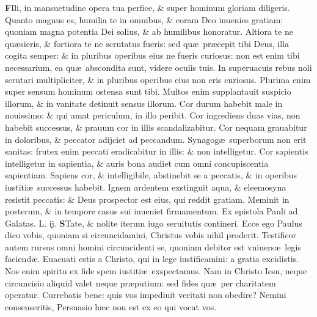 \documentclass[a5paper,10pt]{book}
\def\leftmarginnote{%
	\lrmarginnote{\hskip -\marginparsep \hskip -6.5em}}
\def\rightmarginnote{%
	\lrmarginnote{\hskip\columnwidth \hskip -1em}}
\def\ae{æ}
\begin{document}
\begin{multicols*}{2}
\vspace{-.25em}
\lettrine[lines=2]{\bfseries F}{}Ili, in\rightmarginnote{ca. 3.} mansuetudine opera tua perfice, \& super hominum gloriam diligeris.
Quanto magnus es, humilia te in
omnibus, \& coram Deo inuenies gratiam: quoniam magna potentia Dei solius, \& ab humilibus honoratur.
Altiora te ne qu\ae sieris, \& fortiora te ne scrutatus fueris: sed qu\ae \ pr\ae cepit tibi Deus, illa cogita semper: \& in pluribus operibus eius ne fueris curiosus: non est enim tibi necessarium, ea qu\ae \ abscondita sunt, videre oculis tuis.
In superuacuis rebus noli scrutari multipliciter, \& in pluribus operibus eius non eris curiosus. Plurima enim super sensum hominum ostensa sunt tibi.
Multos enim supplantauit suspicio illorum, \& in vanitate detinuit sensus illorum. Cor durum habebit male in nouissimo: \& qui amat periculum, in illo peribit.
Cor ingrediens duas vias, non habebit successus, \& prauum cor in illis scandalizabitur. Cor nequam grauabitur in doloribus, \& peccator adijciet ad peccandum.
Synagog\ae \ superborum non erit sanitas: frutex enim peccati eradicabitur in illis: \& non intelligetur.
Cor sapientis intelligetur in sapientia, \& auris bona audiet cum omni concupiscentia sapientiam.
Sapiens cor, \& intelligibile, abstinebit se a peccatis, \& in operibus iustiti\ae \ successus habebit.
Ignem ardentem exstinguit aqua, \& eleemosyna resistit peccatis: \& Deus prospector est eius, qui reddit gratiam. Meminit in posterum, \& in tempore casus sui inueniet firmamentum.
\fancyhead[C]{\color{red} Feria. vj. Dominic\ae . j. Vagantium}
\newline {} \color{red} Ex epistola Pauli ad Galatas. \hfill L. ij. \color{black}
\vspace{-.25em}
\lettrine[lines=2]{\bfseries \color{red} S}{}Tate, \& nolite\leftmarginnote{\begin{flushright}ca. 5.\end{flushright}} iterum iugo seruitutis contineri.
Ecce ego Paulus dico vobis, quoniam si circuncidamini, Christus vobis nihil proderit.
Testificor autem rursus omni homini circuncidenti se, quoniam debitor est vniuers\ae \ legis faciend\ae .
Euacuati estis a Christo, qui in lege iustificamini: a gratia excidistis. Nos enim spiritu ex fide spem iustiti\ae \ exspectamus.
Nam in Christo Iesu, neque circuncisio aliquid valet neque pr\ae putium: sed fides qu\ae \ per charitatem operatur.
Currebatis bene: quis vos impediuit veritati non obedire? Nemini consenseritis, Persuasio h\ae c non est ex eo qui vocat vos.

\end{multicols*}
\end{document}
